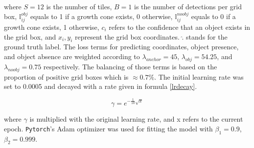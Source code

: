 \vspace{3mm}
\noindent
where $S = 12$ is the number of tiles, $B = 1$ is the number of detections per
grid box, $\mathbb{I}_{ij}^{obj}$ equals to 1 if a growth cone exists, 0
otherwise, $\mathbb{I}_{ij}^{noobj}$ equals to 0 if a growth cone exists, 1
otherwise, $c_i$ refers to the confidence that an object exists in the grid box,
and $x_i, y_i$ represent the grid box coordinates. $\hat{.}$ stands for the
ground truth label. The loss terms for predicting coordinates, object presence,
and object absence are weighted according to $\lambda_{anchor} = 45$,
$\lambda_{obj} = 54.25$, and $\lambda_{noobj} = 0.75$ respectively. The
balancing of those terms is based on the proportion of positive grid boxes which
is $\approx 0.7\%$. The initial learning rate was set to 0.0005 and decayed
with a rate given in formula \ref{lrdecay}.

\begin{equation}
    \gamma = e^{-\frac{1}{10}\sqrt{x}}
    \label{lrdecay}
\end{equation}

\noindent
where $\gamma$ is multiplied with the original learning rate, and x refers to
the current epoch. \verb|Pytorch|'s Adam optimizer \parencite{adam} was used
for fitting the model with $\beta_1 = 0.9$, $\beta_2 = 0.999$.

